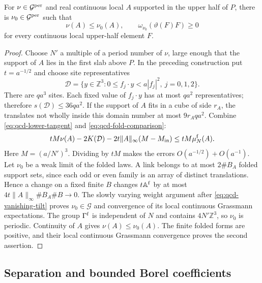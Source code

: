\documentclass[11pt,letterpaper,reqno]{amsart}
\makeatletter
\theoremstyle{definition}
\newcommand{\ms@minorstart}{%
  \pushQED{\qed}\renewcommand{\qedsymbol}{$\blacksquare$}}
\newenvironment{lemma}[1][]{\ms@minorstart\ms@lemma[#1]}
  {\popQED\endms@lemma}
\theoremstyle{remark}
\makeatother
\begin{document}
\begin{lemma}[Comparison states]\label{C-386-34}
For $\nu\in\mathcal G^{\rm per}$ and real continuous local
$A$ supported in the upper half of $P$, there is
$\nu_0\in\mathcal G^{\rm per}$ such that
\[
 \nu(A)\le\nu_0(A),\qquad
 \omega_{\nu_0}(\vartheta(F)F)\ge0
\]
for every continuous local upper-half element $F$.
\end{lemma}

\begin{proof}
Choose $N'$ a multiple of a period number of $\nu$, large
enough that the support of $A$ lies in the first slab above $P$.
In the preceding construction put $t=a^{-1/2}$ and choose
site representatives
\[
 \mathcal D=\{y\in\mathbb Z^3:
             0\le f_j\cdot y<a|f_j|^2,\ j=0,1,2\}.
\]
There are $qa^3$ sites. Each fixed value of $f_j\cdot y$
has at most $qa^2$ representatives; therefore
$s(\mathcal D)\le36qa^2$. If the support of $A$ fits in a
cube of side $r_A$, the translates not wholly inside this
domain number at most $9r_Aqa^2$. Combine
\eqref{eq:qcd-lower-tangent} and \eqref{eq:qcd-fold-comparison}:
\[
 tM\nu(A)-2K(\mathcal D)
      -2t\|A\|_\infty(M-M_{\rm in})
       \le tM\mu_N^{\rm f}(A).
\]
Here $M=(a/N')^3$. Dividing by $tM$ makes the errors
$O(a^{-1/2})+O(a^{-1})$. Let $\nu_0$ be a weak limit of
the folded laws. A link belongs to at most $2\#B_A$ folded
support sets, since each odd or even family is an array of
distinct translations. Hence a change on a fixed finite $B$
changes $t\mathbb A^{\rm f}$ by at most
$4t\|A\|_\infty\#B_A\#B\to0$.
The slowly varying weight argument after
\eqref{eq:qcd-vanishing-tilt} proves $\nu_0\in\mathcal G$ and
convergence of its local continuous Grassmann expectations.
The group $\Gamma^{\rm f}$ is independent of $N$ and contains
$4N'\mathbb Z^3$, so $\nu_0$ is periodic. Continuity of $A$
gives $\nu(A)\le\nu_0(A)$. The finite folded forms are positive,
and their local continuous Grassmann convergence proves the
second assertion.
\end{proof}

\subsection{Separation and bounded Borel coefficients}
\end{document}
